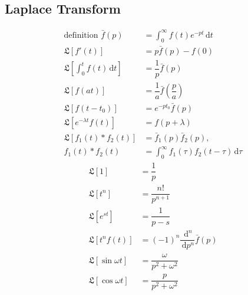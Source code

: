 \documentclass[10pt, a4paper, twocolumn]{article}
\def\d{\,\mathrm{d}}
\def\L{\mathfrak{L}}
\begin{document}
	\subsection{Laplace Transform}
			\begin{align*}
				\text{definition }\bar{f}(p) &= \int_{0}^{\infty}f(t)e^{-pt}\d t\\
				\L[f'(t)] &= p\bar{f}(p) - f(0)\\
				\L[\int^t_0f(t)\d t] &= \dfrac{1}{p}\bar{f}(p)\\
				\L[f(at)] &= \dfrac{1}{a}\bar{f}\left(\dfrac{p}{a}\right)\\
				\L[f(t-t_0)] &= e^{-p t_0}\bar{f}(p)\\
				\L[e^{-\lambda t}f(t)] &= f(p + \lambda)\\
				\L[f_1(t)*f_2(t)] &= \bar{f}_1(p) \bar{f}_2(p), \\
				f_1(t)*f_2(t) &= \int_{0}^{\infty}f_1(\tau)f_2(t-\tau)\d\tau
			\end{align*}
			\begin{align*}
				\L[1] &= \dfrac{1}{p}\\
				\L[t^n] &= \dfrac{n!}{p^{n+1}}\\
				\L[e^{st}] &= \dfrac{1}{p-s}\\
				\L[t^nf(t)] &= (-1)^n \dfrac{\d^n}{\d p^n} \bar{f}(p)\\
				\L[\sin\omega t] &= \dfrac{\omega}{p^2 + \omega^2}\\
				\L[\cos\omega t] &= \dfrac{p}{p^2 + \omega^2}
			\end{align*}
\end{document}
